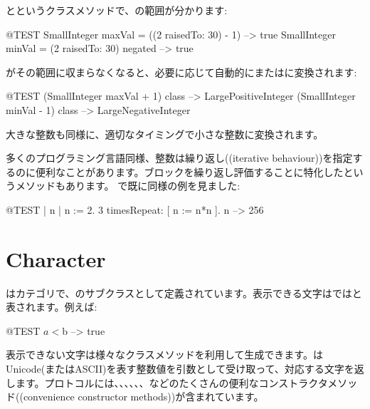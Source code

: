 \documentclass[a4paper,10pt,twoside]{book}
\begin{document}
とというクラスメソッドで、の範囲が分かります:

\begin{code}{@TEST}
SmallInteger maxVal = ((2 raisedTo: 30) - 1)      --> true
SmallInteger minVal = (2 raisedTo: 30) negated --> true
\end{code}

がその範囲に収まらなくなると、必要に応じて自動的にまたはに変換されます:

\begin{code}{@TEST}
(SmallInteger maxVal + 1) class --> LargePositiveInteger
(SmallInteger minVal - 1) class  --> LargeNegativeInteger
\end{code}

大きな整数も同様に、適切なタイミングで小さな整数に変換されます。

多くのプログラミング言語同様、整数は繰り返し((iterative behaviour))を指定するのに便利なことがあります。ブロックを繰り返し評価することに特化したというメソッドもあります。
で既に同様の例を見ました:
\begin{code}{@TEST | n |}
n := 2.
3 timesRepeat: [ n := n*n ].
n --> 256
\end{code}

\section{Character}

はカテゴリで、のサブクラスとして定義されています。表示できる文字は\pharo ではと表されます。例えば:

\begin{code}{@TEST}
$a < $b --> true
\end{code}

表示できない文字は様々なクラスメソッドを利用して生成できます。\mbox{}はUnicode(またはASCII)を表す整数値を引数として受け取って、対応する文字を返します。プロトコルには、、、、、、などのたくさんの便利なコンストラクタメソッド((convenience constructor methods))が含まれています。
\end{document}
